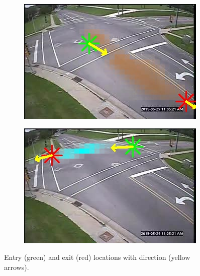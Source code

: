 \begin{figure}
        \begin{subfigure}{0.32\linewidth}
            \includegraphics[width=\linewidth]{./img/scene_learning/res/244458/244458-2.jpg}
        \end{subfigure}
        \begin{subfigure}{0.32\linewidth}
            \includegraphics[width=\linewidth]{./img/scene_learning/res/244458/244458-3.jpg}
        \end{subfigure}
        \caption{Entry (green) and exit (red) locations with direction (yellow arrows).}
        \label{fig:entry-exit-full-1}
\end{figure}

